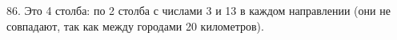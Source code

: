 86. Это 4 столба: по 2 столба с числами 3 и 13 в каждом направлении (они не совпадают, так как между городами 20 километров).\\
